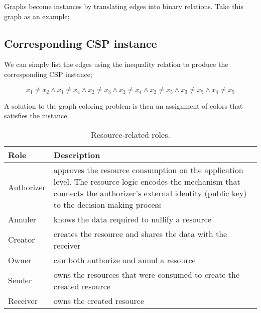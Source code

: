 Graphs become instances by translating edges into binary relations. Take this graph as an example;

\begin{center}
\end{center}

\subsection{Corresponding CSP instance}

We can simply list the edges using the inequality relation to produce the corresponding CSP instance;

\begin{equation}
    x_1 \neq x_2 \wedge x_1 \neq x_4 \wedge x_2 \neq x_3 \wedge x_2 \neq x_4 \wedge x_2 \neq x_5 \wedge x_3 \neq x_5 \wedge x_4 \neq x_5
\end{equation}

A solution to the graph coloring problem is then an assignment of colors that satisfies the instance. 


\begin{table*}[!h]
\begin{center}
\begin{tabular}{|p{1.5cm}|p{13cm}|}
\hline
 \textbf{Role} & \textbf{Description} \\ \hline
 Authorizer & approves the resource consumption on the application level. The resource logic encodes the mechanism that connects the authorizer's external identity (public key) to the decision-making process \\ \hline
 Annuler & knows the data required to nullify a resource
 \\ \hline
Creator & creates the resource and shares the data with the receiver
\\ \hline
Owner & can both authorize and annul a resource
\\ \hline
Sender & owns the resources that were consumed to create the created resource
\\ \hline
Receiver & owns the created resource
\\ \hline
\end{tabular}
\caption{Resource-related roles.}
\end{center}
\end{table*}


